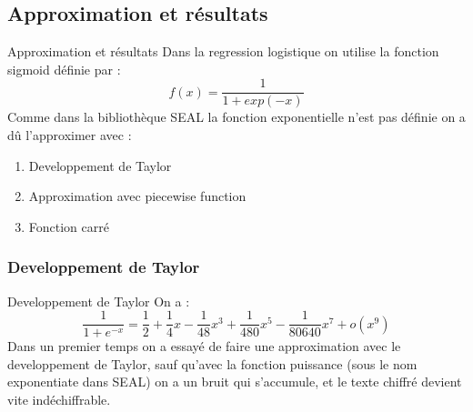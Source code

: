 \documentclass{beamer}
\begin{document}
\subsection{Approximation et résultats}
 \begin{frame}{Approximation et résultats}
 Dans la regression logistique on utilise la fonction sigmoid définie par :\newline
 $$f(x)=\dfrac{1}{1 + exp(-x)}$$
 Comme dans la bibliothèque SEAL la fonction exponentielle n'est pas définie on a dû l'approximer avec :\newline
\begin{enumerate}
	\item{Developpement de Taylor}
	\item{Approximation avec piecewise function}
	\item{Fonction carré}
\end{enumerate}
\end{frame}
\subsubsection{Developpement de Taylor}
\begin{frame}{Developpement de Taylor}
On a :
\newcommand\omicron{o}
 $$\dfrac{1}{1+e^{-x}} = \dfrac{1}{2} + \dfrac{1}{4}x - \dfrac{1}{48}x^3 + \dfrac{1}{480}x^5 - \dfrac{1}{80640}x^7 + \omicron(x^9)$$
Dans un premier temps on a essayé de faire une approximation avec le developpement de Taylor, sauf qu'avec la fonction puissance (sous le nom exponentiate dans SEAL) on a un bruit qui s'accumule, et le texte chiffré devient vite indéchiffrable. 
\end{frame}
\end{document}
